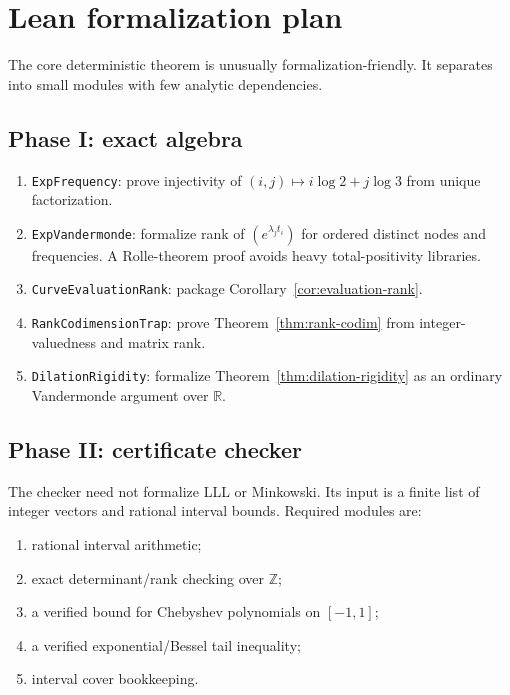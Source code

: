 \documentclass[11pt,oneside]{article}
\theoremstyle{definition}
\theoremstyle{remark}
\newcommand{\Z}{\mathbb Z}
\newcommand{\R}{\mathbb R}
\begin{document}
\section{Lean formalization plan}
\label{sec:lean-plan}

The core deterministic theorem is unusually formalization-friendly.  It separates into small
modules with few analytic dependencies.

\subsection{Phase I: exact algebra}

\begin{enumerate}
\item \texttt{ExpFrequency}: prove injectivity of
$(i,j)\mapsto i\log2+j\log3$ from unique factorization.
\item \texttt{ExpVandermonde}: formalize rank of
$(e^{\lambda_jt_i})$ for ordered distinct nodes and frequencies.  A Rolle-theorem proof avoids
heavy total-positivity libraries.
\item \texttt{CurveEvaluationRank}: package Corollary~\ref{cor:evaluation-rank}.
\item \texttt{RankCodimensionTrap}: prove Theorem~\ref{thm:rank-codim} from integer-valuedness
and matrix rank.
\item \texttt{DilationRigidity}: formalize Theorem~\ref{thm:dilation-rigidity} as an ordinary
Vandermonde argument over $\R$.
\end{enumerate}

\subsection{Phase II: certificate checker}

The checker need not formalize LLL or Minkowski.  Its input is a finite list of integer vectors
and rational interval bounds.  Required modules are:

\begin{enumerate}
\item rational interval arithmetic;
\item exact determinant/rank checking over $\Z$;
\item a verified bound for Chebyshev polynomials on $[-1,1]$;
\item a verified exponential/Bessel tail inequality;
\item interval cover bookkeeping.
\end{enumerate}
\end{document}
